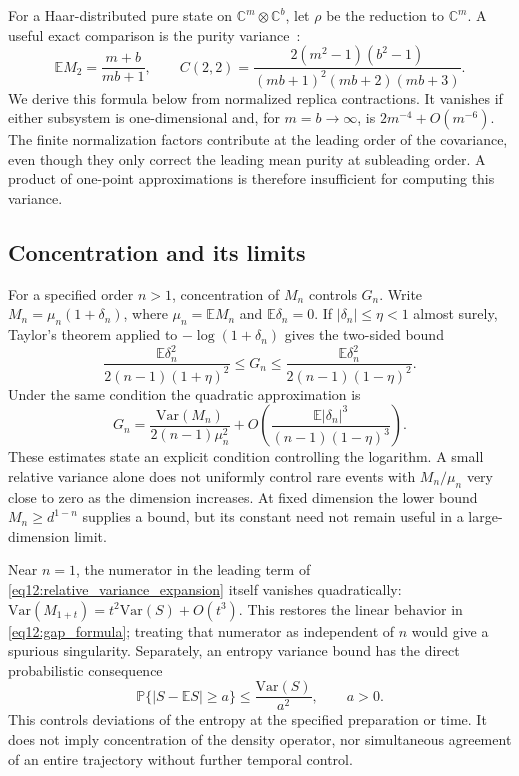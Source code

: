 \documentclass[11pt,letterpaper]{article}
\theoremstyle{plain}
\theoremstyle{definition}
\theoremstyle{remark}
\newcommand{\E}{\mathbb{E}}
\newcommand{\Var}{\text{Var}}
\newcommand{\Prob}{\mathbb{P}}
\begin{document}
For a Haar-distributed pure state on $\mathbb C^m\otimes\mathbb C^b$,
let $\rho$ be the reduction to $\mathbb C^m$.  A useful exact comparison
is the purity variance~\citep{giraud2007}:
\begin{equation}
 \E M_2=\frac{m+b}{mb+1},\qquad
 C(2,2)=\frac{2(m^2-1)(b^2-1)}{(mb+1)^2(mb+2)(mb+3)}.
 \label{eq12:haar_purity_variance}
\end{equation}
We derive this formula below from normalized replica contractions.  It vanishes if either subsystem
is one-dimensional and, for $m=b\to\infty$, is $2m^{-4}+O(m^{-6})$.
The finite normalization factors contribute at the leading order of
the covariance, even though they only correct the leading mean purity
at subleading order.  A product of one-point approximations is therefore
insufficient for computing this variance.

\subsection{Concentration and its limits}
\label{subsec12:self_averaging}

For a specified order $n>1$, concentration of $M_n$ controls $G_n$.
Write $M_n=\mu_n(1+\delta_n)$, where $\mu_n=\E M_n$ and
$\E\delta_n=0$.  If $|\delta_n|\leq\eta<1$ almost surely, Taylor's
theorem applied to $-\log(1+\delta_n)$ gives the two-sided bound
\begin{equation}
 \frac{\E\delta_n^2}{2(n-1)(1+\eta)^2}
 \leq G_n\leq
 \frac{\E\delta_n^2}{2(n-1)(1-\eta)^2}.
 \label{eq12:gap_bound}
\end{equation}
Under the same condition the quadratic approximation is
\begin{equation}
 G_n=\frac{\Var(M_n)}{2(n-1)\mu_n^2}
 +O\!\left(\frac{\E|\delta_n|^3}{(n-1)(1-\eta)^3}\right).
 \label{eq12:relative_variance_expansion}
\end{equation}
These estimates state an explicit condition controlling the logarithm.
A small relative variance alone does not uniformly control rare events
with $M_n/\mu_n$ very close to zero as the dimension increases.  At
fixed dimension the lower bound $M_n\geq d^{1-n}$ supplies a bound,
but its constant need not remain useful in a large-dimension limit.

Near $n=1$, the numerator in the leading term of
\eqref{eq12:relative_variance_expansion} itself vanishes quadratically:
$\Var(M_{1+t})=t^2\Var(S)+O(t^3)$.  This restores the linear behavior
in \eqref{eq12:gap_formula}; treating that numerator as independent of
$n$ would give a spurious singularity.  Separately, an entropy variance
bound has the direct probabilistic consequence
\begin{equation}
 \Prob\{|S-\E S|\geq a\}\leq\frac{\Var(S)}{a^2},\qquad a>0.
 \label{eq12:entropy_concentration}
\end{equation}
This controls deviations of the entropy at the specified preparation
or time.  It does not imply concentration of the density operator, nor
simultaneous agreement of an entire trajectory without further temporal
control.
\end{document}

